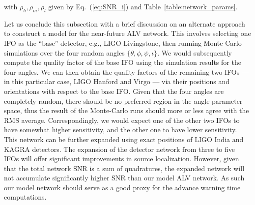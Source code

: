 \documentclass[prd,amsmath,amssymb,aps,floats,amsfonts,notitlepage,superscriptaddress,eqsecnum,nofootinbib,10pt]{revtex4-1}
\begin{document}
with $\rho_h, \rho_m,\rho_l$ given by Eq.~(\ref{eq:SNR_i}) and Table~\ref{table:network_params}.
%

Let us conclude this subsection with a brief discussion on 
an alternate approach to construct a model for the near-future ALV network.
This involves selecting one IFO as the ``base'' detector, e.g., LIGO Livingstone, then running Monte-Carlo simulations over the four random angles $\{\theta,\phi,\psi,\iota\}$. 
We would subsequently compute the quality factor of the base IFO using the
simulation results for the four angles.
We can then obtain the quality factors of the remaining two IFOs 
--- in this particular case, LIGO Hanford and Virgo --- via their positions and orientations with respect to the base IFO. Given that the four angles
are completely random, there should be no preferred region in the angle parameter space, thus the result of the Monte-Carlo runs should more or less agree with the RMS average. Correspondingly, we would expect one of the other two IFOs to have somewhat higher sensitivity, and the other one to have lower sensitivity.
This network can be further expanded using exact positions of LIGO India
and KAGRA detectors. The expansion of the detector network from three to five IFOs will offer significant improvements in source localization.
However, given that the total network SNR is a sum of quadratures, the 
expanded network will not accumulate significantly higher SNR than
our model ALV network. As such our model network should serve as a good proxy for the advance warning time computations.
\end{document}
